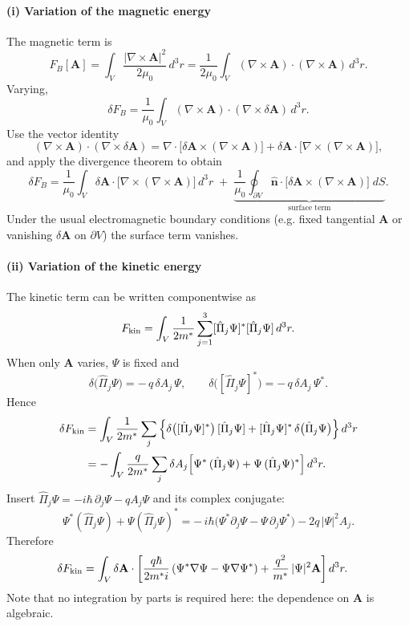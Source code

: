 \paragraph{(i) Variation of the magnetic energy}
The magnetic term is
\[
F_B[\mathbf A]=\int_V \frac{|\nabla\times \mathbf A|^2}{2\mu_0}\,d^3r
=\frac{1}{2\mu_0}\int_V (\nabla\times\mathbf A)\cdot(\nabla\times\mathbf A)\,d^3r .
\]
Varying,
\[
\delta F_B
=\frac{1}{\mu_0}\int_V (\nabla\times\mathbf A)\cdot(\nabla\times\delta\mathbf A)\,d^3r .
\]
Use the vector identity
\[
(\nabla\times\mathbf A)\cdot(\nabla\times\delta\mathbf A)
= \nabla\!\cdot\!\big[\delta\mathbf A\times(\nabla\times\mathbf A)\big]
+ \delta\mathbf A\cdot\big[\nabla\times(\nabla\times\mathbf A)\big],
\]
and apply the divergence theorem to obtain
\begin{equation}
\delta F_B
= \frac{1}{\mu_0}\int_V \delta\mathbf A\cdot\big[\nabla\times(\nabla\times\mathbf A)\big]\,d^3r
\;+\; \underbrace{\frac{1}{\mu_0}\oint_{\partial V}
\hat{\mathbf n}\cdot\!\big[\delta\mathbf A\times(\nabla\times\mathbf A)\big]\;dS}_{\text{surface term}} .
\label{app:FB-var}
\end{equation}
Under the usual electromagnetic boundary conditions (e.g. fixed tangential \(\mathbf A\) or vanishing \(\delta\mathbf A\) on \(\partial V\)) the surface term vanishes.

\paragraph{(ii) Variation of the kinetic energy}
The kinetic term can be written componentwise as
\[
F_{\rm kin}=\int_V \frac{1}{2m^*}\sum_{j=1}^3 [\hat\Pi_j\Psi]^*[\hat\Pi_j\Psi]\,d^3r .
\]
When only \(\mathbf A\) varies, \(\Psi\) is fixed and
\[
\delta\big(\hat\Pi_j\Psi\big)= -\,q\,\delta A_j\,\Psi,
\qquad
\delta\big([\hat\Pi_j\Psi]^*\big)= -\,q\,\delta A_j\,\Psi^* .
\]
Hence
\begin{align}
\delta F_{\rm kin}
&= \int_V \frac{1}{2m^*}\sum_j
\Big\{ \delta\big([\hat\Pi_j\Psi]^*\big)\,[\hat\Pi_j\Psi]
+ [\hat\Pi_j\Psi]^*\,\delta\big(\hat\Pi_j\Psi\big) \Big\}\,d^3r \nonumber\\
&= -\int_V \frac{q}{2m^*}\sum_j \delta A_j
\Big[ \Psi^*\,(\hat\Pi_j\Psi) + \Psi\,(\hat\Pi_j\Psi)^* \Big]\,d^3r \nonumber .
\end{align}
Insert \(\hat\Pi_j\Psi=-i\hbar\,\partial_j\Psi - qA_j\Psi\) and its complex conjugate:
\[
\Psi^*(\hat\Pi_j\Psi) + \Psi(\hat\Pi_j\Psi)^*
= -\,i\hbar\big(\Psi^*\partial_j\Psi - \Psi\,\partial_j\Psi^*\big)
- 2q\,|\Psi|^2 A_j .
\]
Therefore
\begin{align}
\delta F_{\rm kin}
&= \int_V \delta\mathbf A\cdot
\left[
\frac{q\hbar}{2m^* i}\,(\Psi^*\nabla\Psi - \Psi\nabla\Psi^*)
+ \frac{q^2}{m^*}\,|\Psi|^2 \mathbf A
\right] d^3r .
\label{app:Fkin-var-final}
\end{align}
Note that no integration by parts is required here: the dependence on \(\mathbf A\) is algebraic.

